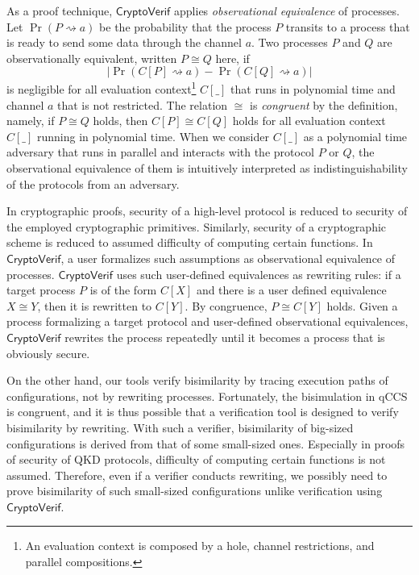 As a proof technique, $\mathsf{CryptoVerif}$ applies 
\emph{observational equivalence} of processes.
Let $\Pr(P \rightsquigarrow a)$
be the probability
that the process $P$ transits to a process that is ready to send some
data through the channel $a$.
Two processes $P$ and $Q$ are observationally equivalent, written
$P \cong Q$ here, if
$$
|\Pr(C[P] \rightsquigarrow a) - \Pr(C[Q] \rightsquigarrow a)|
$$
is negligible for all evaluation context\footnote{An evaluation context
is composed by a hole, channel restrictions, and
parallel compositions.}
$C[\_]$ that runs in polynomial time
and channel $a$ that is
not restricted. 
The relation $\cong$ is \emph{congruent} by the definition,
namely, if $P \cong Q$ holds, then $C[P] \cong C[Q]$ holds for all
evaluation context $C[\_]$ running in polynomial time.
When we consider $C[\_]$ as a polynomial time
adversary that runs in parallel and interacts with the protocol $P$ or
$Q$,
the observational equivalence of them is intuitively interpreted
as indistinguishability of the protocols from an adversary.

In cryptographic proofs, security of a high-level protocol
is reduced to security of the employed cryptographic primitives.
Similarly, security of a cryptographic scheme is reduced to 
assumed difficulty of computing certain functions.
In $\mathsf{CryptoVerif}$, a user formalizes such assumptions as
observational equivalence of processes.
$\mathsf{CryptoVerif}$ uses such user-defined equivalences as
rewriting rules:
if a target process $P$ is of the form $C[X]$ and there is a user
defined
equivalence $X \cong Y$, then it is rewritten to $C[Y]$.
By congruence, $P \cong C[Y]$ holds.
Given a process formalizing a target protocol and 
user-defined observational equivalences, 
$\mathsf{CryptoVerif}$
rewrites the process repeatedly until it becomes a process
that is obviously secure.

On the other hand, our tools verify bisimilarity by
tracing execution paths of configurations, not by
rewriting processes.
Fortunately, the bisimulation in qCCS is congruent, and
it is thus possible that a verification tool is
designed to verify bisimilarity by rewriting.
With such a verifier, bisimilarity of 
big-sized configurations is derived from that of some small-sized ones.
Especially in proofs of security of QKD protocols,
difficulty of computing certain functions is not assumed.
Therefore, even if a verifier conducts rewriting,
we possibly need to prove bisimilarity of
such small-sized configurations unlike
verification using $\mathsf{CryptoVerif}$.
